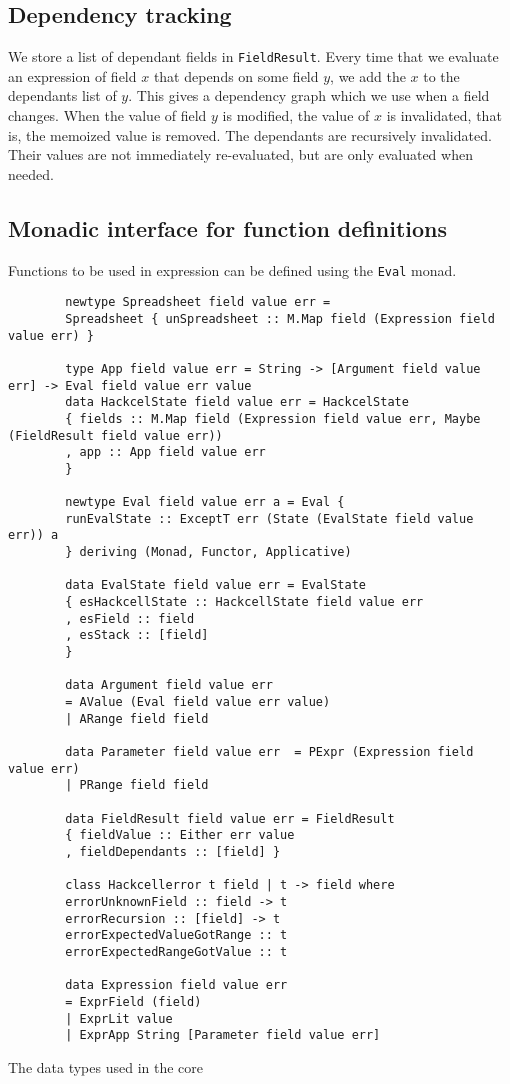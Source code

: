 \documentclass{article}
\begin{document}
	\subsection{Dependency tracking}
	We store a list of dependant fields in \texttt{FieldResult}. Every time that we evaluate an expression of field $x$ that depends on some field $y$, we add the $x$ to the dependants list of $y$. This gives a dependency graph which we use when a field changes. When the value of field $y$ is modified, the value of $x$ is invalidated, that is, the memoized value is removed. The dependants are recursively invalidated. Their values are not immediately re-evaluated, but are only evaluated when needed.
	
	\subsection{Monadic interface for function definitions}
	Functions to be used in expression can be defined using the \texttt{Eval} monad.
	
	
	\begin{listing}
		\begin{verbatim}
		newtype Spreadsheet field value err =
		Spreadsheet { unSpreadsheet :: M.Map field (Expression field value err) }
		
		type App field value err = String -> [Argument field value err] -> Eval field value err value
		data HackcelState field value err = HackcelState
		{ fields :: M.Map field (Expression field value err, Maybe (FieldResult field value err))
		, app :: App field value err
		}
		
		newtype Eval field value err a = Eval {
		runEvalState :: ExceptT err (State (EvalState field value err)) a
		} deriving (Monad, Functor, Applicative)
		
		data EvalState field value err = EvalState
		{ esHackcellState :: HackcellState field value err
		, esField :: field
		, esStack :: [field]
		}
		
		data Argument field value err
		= AValue (Eval field value err value)
		| ARange field field
		
		data Parameter field value err  = PExpr (Expression field value err)
		| PRange field field
		
		data FieldResult field value err = FieldResult
		{ fieldValue :: Either err value
		, fieldDependants :: [field] }
		
		class Hackcellerror t field | t -> field where
		errorUnknownField :: field -> t
		errorRecursion :: [field] -> t
		errorExpectedValueGotRange :: t
		errorExpectedRangeGotValue :: t
		
		data Expression field value err
		= ExprField (field)
		| ExprLit value
		| ExprApp String [Parameter field value err]
		\end{verbatim}
		\caption{The data types used in the core}
		\label{listing:datatypes}
	\end{listing}
	
\end{document}
